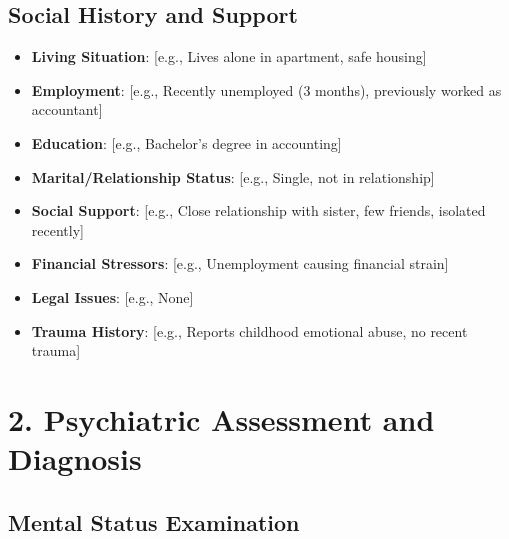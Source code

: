 \documentclass[11pt,letterpaper]{article}
\begin{document}
\subsection*{Social History and Support}

\begin{itemize}[leftmargin=*]
    \item \textbf{Living Situation}: [e.g., Lives alone in apartment, safe housing]
    \item \textbf{Employment}: [e.g., Recently unemployed (3 months), previously worked as accountant]
    \item \textbf{Education}: [e.g., Bachelor's degree in accounting]
    \item \textbf{Marital/Relationship Status}: [e.g., Single, not in relationship]
    \item \textbf{Social Support}: [e.g., Close relationship with sister, few friends, isolated recently]
    \item \textbf{Financial Stressors}: [e.g., Unemployment causing financial strain]
    \item \textbf{Legal Issues}: [e.g., None]
    \item \textbf{Trauma History}: [e.g., Reports childhood emotional abuse, no recent trauma]
\end{itemize}

\section*{2. Psychiatric Assessment and Diagnosis}

\subsection*{Mental Status Examination}
\end{document}
